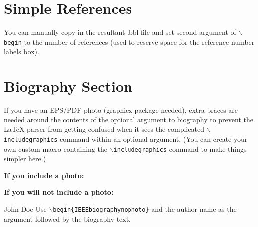 \documentclass[lettersize,journal]{IEEEtran}
\begin{document}
 \section{Simple References}
 You can manually copy in the resultant .bbl file and set second argument of $\backslash${\tt{begin}} to the number of references
 (used to reserve space for the reference number labels box).

%




 \newpage


 \section{Biography Section}
 If you have an EPS/PDF photo (graphicx package needed), extra braces are
 needed around the contents of the optional argument to biography to prevent
 the LaTeX parser from getting confused when it sees the complicated
 $\backslash${\tt{includegraphics}} command within an optional argument. (You can create
 your own custom macro containing the $\backslash${\tt{includegraphics}} command to make things
 simpler here.)

 \vspace{11pt}

 \bf{If you include a photo:}\vspace{-33pt}

 \vspace{11pt}

 \bf{If you will not include a photo:}\vspace{-33pt}
 \begin{IEEEbiographynophoto}{John Doe}
  Use $\backslash${\tt{begin\{IEEEbiographynophoto\}}} and the author name as the argument followed by the biography text.
 \end{IEEEbiographynophoto}




 \vfill
\end{document}
